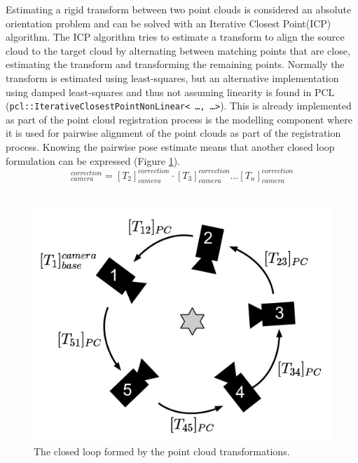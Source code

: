\noindent Estimating a rigid transform between two point clouds is considered an absolute orientation problem \cite{Horn1987} and can be solved with an Iterative Closest Point(ICP) algorithm. The ICP algorithm tries to estimate a transform to align the source cloud to the target cloud by alternating between matching points that are close, estimating the transform and transforming the remaining points. Normally the transform is estimated using least-squares, but an alternative implementation using damped least-squares\cite{Gavin2011} and thus not assuming linearity is found in PCL (\texttt{pcl::IterativeClosestPointNonLinear< \ldots , \ldots >}). This is already implemented as part of the point cloud registration process is the modelling component where it is used for pairwise alignment of the point clouds as part of the registration process. Knowing the pairwise pose estimate means that another closed loop formulation can be expressed (Figure \ref{fig:new_calibration}). \\

\begin{equation}
[T_1]_{camera}^{correction} = [T_2]_{camera}^{correction} \cdot [T_3]_{camera}^{correction} \dots [T_n]_{camera}^{correction}
\end{equation}\\

\begin{figure}[htb]
	\begin{center}
		\includegraphics[scale=0.4,trim=0 0 0 0]{graphics/03_calibration/new_calibration.pdf}%
		\caption{The closed loop formed by the point cloud transformations.}\label{fig:new_calibration}
	\end{center}
\end{figure}

